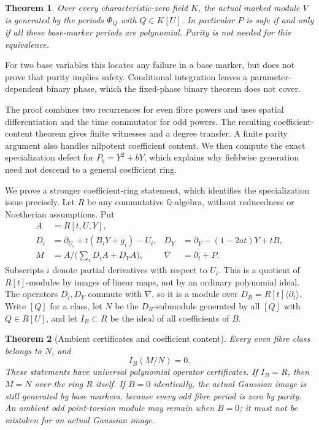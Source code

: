 \documentclass[11pt]{article}
\newtheorem{theorem}{Theorem}[section]
\theoremstyle{definition}\newtheorem{definition}[theorem]{Definition}
\theoremstyle{remark}\newtheorem{remark}[theorem]{Remark}
\begin{document}
\begin{theorem}\label{thm:actual}
Over every characteristic-zero field $K$, the actual marked module $V$
is generated by the periods $\Phi_Q$ with $Q\in K[U]$.
In particular $P$ is safe if and only if all these base-marker periods
are polynomial. Purity is not needed for this equivalence.

\end{theorem}

For two base variables this locates any failure in a base marker, but
does not prove that purity implies safety. Conditional integration leaves
a parameter-dependent binary phase, which the fixed-phase binary theorem
does not cover.

The proof combines two recurrences for even fibre powers and uses
spatial differentiation and the time commutator for odd powers.
The resulting coefficient-content theorem gives finite witnesses and
a degree transfer. A finite parity argument also handles nilpotent
coefficient content. We then compute the exact specialization defect
for $P_b=Y^2+bY$, which explains why fieldwise generation need not
descend to a general coefficient ring.

We prove a stronger coefficient-ring statement, which identifies
the specialization issue precisely. Let $R$ be any commutative
$\mathbb Q$-algebra, without reducedness or Noetherian assumptions.
Put
\begin{align*}
 A&=R[t,U,Y],\\
 D_i&=\partial_{U_i}+t(B_iY+g_i)-U_i,
 &D_Y&=\partial_Y-(1-2at)Y+tB,\\
 M&=A\big/\bigl(\sum_iD_iA+D_YA\bigr),
 &\nabla&=\partial_t+P.
\end{align*}
Subscripts $i$ denote partial derivatives with respect to $U_i$.
This is a quotient of $R[t]$-modules by images of linear maps, not
by an ordinary polynomial ideal. The operators $D_i,D_Y$ commute
with $\nabla$, so it is a module over $D_R=R[t]\langle\partial_t\rangle$.
Write $[Q]$ for a class, let $N$ be the $D_R$-submodule generated by
all $[Q]$ with $Q\in R[U]$, and let $I_B\subset R$ be the ideal
of all coefficients of $B$.

\begin{theorem}[Ambient certificates and coefficient content]
\label{thm:content}
Every even fibre class belongs to $N$, and
\[
 I_B(M/N)=0.
\]
These statements have universal polynomial operator certificates.
If $I_B=R$, then $M=N$ over the ring $R$ itself. If $B=0$
identically, the actual Gaussian image is still generated by base
markers, because every odd fibre period is zero by parity.
An ambient odd point-torsion module may remain when $B=0$;
it must not be mistaken for an actual Gaussian image.
\end{theorem}
\end{document}
